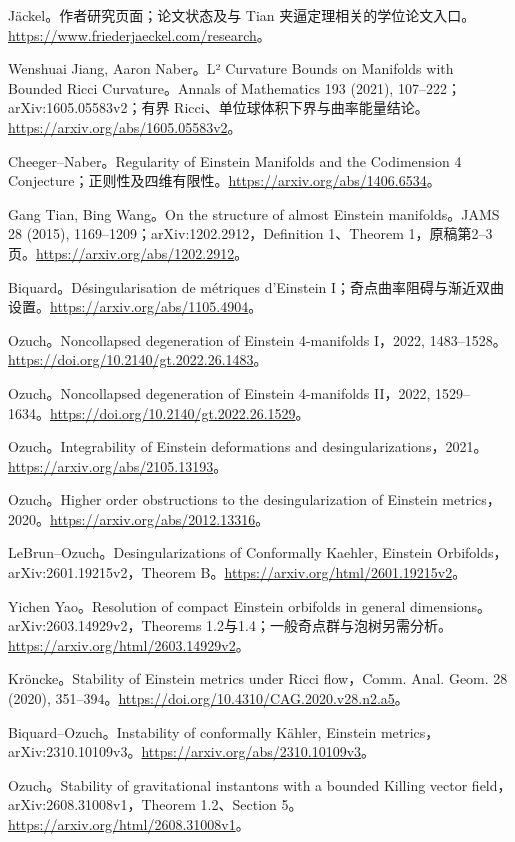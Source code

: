 \documentclass[11pt,a4paper]{article}
\theoremstyle{definition}
\begin{document}
\begin{enumerate}[label={[\arabic*]},leftmargin=2.2em,itemsep=0.55em]
\item Jäckel。作者研究页面；论文状态及与 Tian 夹逼定理相关的学位论文入口。\url{https://www.friederjaeckel.com/research}。
\item Wenshuai Jiang, Aaron Naber。L² Curvature Bounds on Manifolds with Bounded Ricci Curvature。Annals of Mathematics 193 (2021), 107--222；arXiv:1605.05583v2；有界 Ricci、单位球体积下界与曲率能量结论。\url{https://arxiv.org/abs/1605.05583v2}。
\item Cheeger--Naber。Regularity of Einstein Manifolds and the Codimension 4 Conjecture；正则性及四维有限性。\url{https://arxiv.org/abs/1406.6534}。
\item Gang Tian, Bing Wang。On the structure of almost Einstein manifolds。JAMS 28 (2015), 1169--1209；arXiv:1202.2912，Definition 1、Theorem 1，原稿第2--3页。\url{https://arxiv.org/abs/1202.2912}。
\item Biquard。Désingularisation de métriques d'Einstein I；奇点曲率阻碍与渐近双曲设置。\url{https://arxiv.org/abs/1105.4904}。
\item Ozuch。Noncollapsed degeneration of Einstein 4-manifolds I，2022, 1483--1528。\url{https://doi.org/10.2140/gt.2022.26.1483}。
\item Ozuch。Noncollapsed degeneration of Einstein 4-manifolds II，2022, 1529--1634。\url{https://doi.org/10.2140/gt.2022.26.1529}。
\item Ozuch。Integrability of Einstein deformations and desingularizations，2021。\url{https://arxiv.org/abs/2105.13193}。
\item Ozuch。Higher order obstructions to the desingularization of Einstein metrics，2020。\url{https://arxiv.org/abs/2012.13316}。
\item LeBrun--Ozuch。Desingularizations of Conformally Kaehler, Einstein Orbifolds，arXiv:2601.19215v2，Theorem B。\url{https://arxiv.org/html/2601.19215v2}。
\item Yichen Yao。Resolution of compact Einstein orbifolds in general dimensions。arXiv:2603.14929v2，Theorems 1.2与1.4；一般奇点群与泡树另需分析。\url{https://arxiv.org/html/2603.14929v2}。
\item Kröncke。Stability of Einstein metrics under Ricci flow，Comm. Anal. Geom. 28 (2020), 351--394。\url{https://doi.org/10.4310/CAG.2020.v28.n2.a5}。
\item Biquard--Ozuch。Instability of conformally Kähler, Einstein metrics，arXiv:2310.10109v3。\url{https://arxiv.org/abs/2310.10109v3}。
\item Ozuch。Stability of gravitational instantons with a bounded Killing vector field，arXiv:2608.31008v1，Theorem 1.2、Section 5。\url{https://arxiv.org/html/2608.31008v1}。

\end{enumerate}
\end{document}

